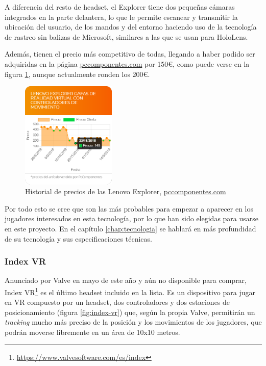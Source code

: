 A diferencia del resto de headset, el Explorer tiene dos pequeñas cámaras integrados en la parte delantera, lo que le permite escanear y transmitir la ubicación del usuario, de los mandos y del entorno haciendo uso de la tecnología de rastreo sin balizas de Microsoft, similares a las que se usan para HoloLens.

Además, tienen el precio más competitivo de todas, llegando a haber podido ser adquiridas en la página \url{pccomponentes.com} por 150\euro, como puede verse en la figura \ref{fig:precios-explorer}, aunque actualmente ronden los 200\euro. 

\begin{figure}[!h]
\begin{center}
    \includegraphics[width=0.4\textwidth]{imagenes/2/precios-explorer.png}
    \caption{Historial de precios de las Lenovo Explorer, \url{pccomponentes.com}}
    \label{fig:precios-explorer}
\end{center}
\end{figure}

Por todo esto se cree que son las más probables para empezar a aparecer en los jugadores interesados en esta tecnología, por lo que han sido elegidas para usarse en este proyecto. En el capítulo \ref{chap:tecnologia} se hablará en más profundidad de su tecnología y sus especificaciones técnicas.

\subsubsection{Index VR}

Anunciado por Valve en mayo de este año y aún no disponible para comprar, Index VR\footnote{\url{https://www.valvesoftware.com/es/index}} es el último headset incluido en la lista. Es un dispositivo para jugar en \acs{VR} compuesto por un headset, dos controladores y dos estaciones de posicionamiento (figura \ref{fig:index-vr}) que, según la propia Valve, permitirán un \textit{tracking} mucho más preciso de la posición y los movimientos de los jugadores, que podrán moverse libremente en un área de 10x10 metros.

